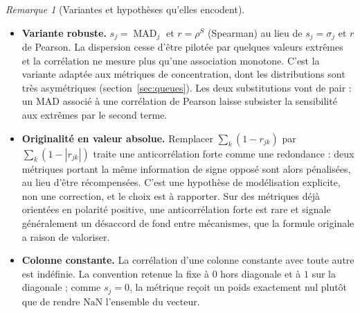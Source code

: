 \documentclass[11pt,a4paper]{article}
\theoremstyle{definition}
\theoremstyle{remark}
\newtheorem{remarque}{Remarque}[section]
\newcommand{\abs}[1]{\left\lvert #1 \right\rvert}
\newcommand{\MAD}{\operatorname{MAD}}
\begin{document}
\begin{remarque}[Variantes et hypothèses qu'elles encodent]
  \label{rem:critic-variantes}
  \

  \medskip

  \begin{itemize}[nosep,leftmargin=1.4em]
    \item \textbf{Variante robuste.} $s_j = \MAD_j$ et $r = \rho^S$ (Spearman) au lieu de
    $s_j = \sigma_j$ et $r$ de Pearson. La dispersion cesse d'être pilotée par quelques
    valeurs extrêmes et la corrélation ne mesure plus qu'une association monotone. C'est
    la variante adaptée aux métriques de concentration, dont les distributions sont très
    asymétriques (section~\ref{sec:queues}). Les deux substitutions vont de pair : un MAD
    associé à une corrélation de Pearson laisse subsister la sensibilité aux extrêmes par
    le second terme.
    \item \textbf{Originalité en valeur absolue.} Remplacer $\sum_k (1 - r_{jk})$ par
    $\sum_k (1 - \abs{r_{jk}})$ traite une anticorrélation forte comme une redondance :
    deux métriques portant la même information de signe opposé sont alors pénalisées,
    au lieu d'être récompensées. C'est une hypothèse de modélisation explicite, non une
    correction, et le choix est à rapporter. Sur des métriques déjà orientées en polarité
    positive, une anticorrélation forte est rare et signale généralement un désaccord de
    fond entre mécanismes, que la formule originale a raison de valoriser.
    \item \textbf{Colonne constante.} La corrélation d'une colonne constante avec toute
    autre est indéfinie. La convention retenue la fixe à $0$ hors diagonale et à $1$ sur
    la diagonale ; comme $s_j = 0$, la métrique reçoit un poids exactement nul plutôt que
    de rendre $\mathrm{NaN}$ l'ensemble du vecteur.
  \end{itemize}
\end{remarque}

\bigskip
\end{document}
